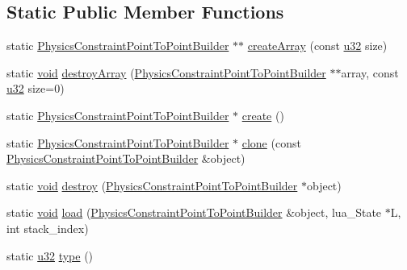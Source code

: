 \subsection*{Static Public Member Functions}
\begin{DoxyCompactItemize}
\item 
static \mbox{\hyperlink{classnjli_1_1_physics_constraint_point_to_point_builder}{Physics\+Constraint\+Point\+To\+Point\+Builder}} $\ast$$\ast$ \mbox{\hyperlink{classnjli_1_1_physics_constraint_point_to_point_builder_a1fb76f2a849d7f2a659d82a0ea509a93}{create\+Array}} (const \mbox{\hyperlink{_util_8h_a10e94b422ef0c20dcdec20d31a1f5049}{u32}} size)
\item 
static \mbox{\hyperlink{_thread_8h_af1e856da2e658414cb2456cb6f7ebc66}{void}} \mbox{\hyperlink{classnjli_1_1_physics_constraint_point_to_point_builder_a5db886abd25700bce341507f41d387c4}{destroy\+Array}} (\mbox{\hyperlink{classnjli_1_1_physics_constraint_point_to_point_builder}{Physics\+Constraint\+Point\+To\+Point\+Builder}} $\ast$$\ast$array, const \mbox{\hyperlink{_util_8h_a10e94b422ef0c20dcdec20d31a1f5049}{u32}} size=0)
\item 
static \mbox{\hyperlink{classnjli_1_1_physics_constraint_point_to_point_builder}{Physics\+Constraint\+Point\+To\+Point\+Builder}} $\ast$ \mbox{\hyperlink{classnjli_1_1_physics_constraint_point_to_point_builder_a9188b738b38a4e3cd498de1b74e559c6}{create}} ()
\item 
static \mbox{\hyperlink{classnjli_1_1_physics_constraint_point_to_point_builder}{Physics\+Constraint\+Point\+To\+Point\+Builder}} $\ast$ \mbox{\hyperlink{classnjli_1_1_physics_constraint_point_to_point_builder_accf99fe85ce75a56451259ff26975c66}{clone}} (const \mbox{\hyperlink{classnjli_1_1_physics_constraint_point_to_point_builder}{Physics\+Constraint\+Point\+To\+Point\+Builder}} \&object)
\item 
static \mbox{\hyperlink{_thread_8h_af1e856da2e658414cb2456cb6f7ebc66}{void}} \mbox{\hyperlink{classnjli_1_1_physics_constraint_point_to_point_builder_ac897b22aa3994deb31a875dd7047d8c0}{destroy}} (\mbox{\hyperlink{classnjli_1_1_physics_constraint_point_to_point_builder}{Physics\+Constraint\+Point\+To\+Point\+Builder}} $\ast$object)
\item 
static \mbox{\hyperlink{_thread_8h_af1e856da2e658414cb2456cb6f7ebc66}{void}} \mbox{\hyperlink{classnjli_1_1_physics_constraint_point_to_point_builder_a6f88d40ffba6ac5e04a3bf0d95cb8286}{load}} (\mbox{\hyperlink{classnjli_1_1_physics_constraint_point_to_point_builder}{Physics\+Constraint\+Point\+To\+Point\+Builder}} \&object, lua\+\_\+\+State $\ast$L, int stack\+\_\+index)
\item 
static \mbox{\hyperlink{_util_8h_a10e94b422ef0c20dcdec20d31a1f5049}{u32}} \mbox{\hyperlink{classnjli_1_1_physics_constraint_point_to_point_builder_a883748c7fa30b1c3f4e340e7f4aaf7d2}{type}} ()
\end{DoxyCompactItemize}
